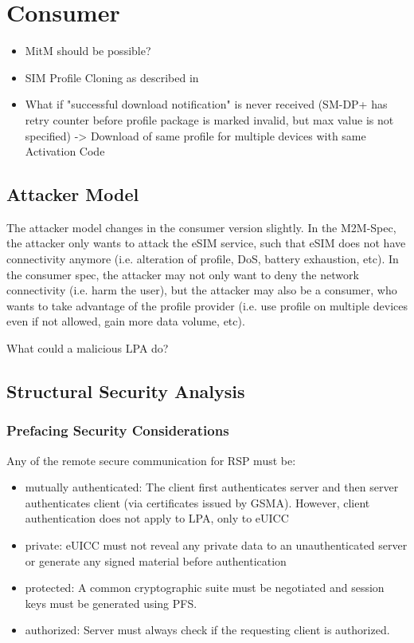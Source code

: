 \section{Consumer}
\begin{itemize}
    \item MitM should be possible? 
    \item SIM Profile Cloning as described in \parencite{Ahmed:TransparancyProfile}
    \item What if "successful download notification" is never received (SM-DP+ has retry counter before profile package is marked invalid, but max value is not specified) -> Download of same profile for multiple devices with same Activation Code
\end{itemize}

\subsection{Attacker Model}
The attacker model changes in the consumer version slightly. In the M2M-Spec, the attacker only wants to attack the eSIM service, such that eSIM does not have connectivity anymore (i.e. alteration of profile, DoS, battery exhaustion, etc). In the consumer spec, the attacker may not only want to deny the network connectivity (i.e. harm the user), but the attacker may also be a consumer, who wants to take advantage of the profile provider (i.e. use profile on multiple devices even if not allowed, gain more data volume, etc). 

What could a malicious LPA do?

\subsection{Structural Security Analysis}

\subsubsection{Prefacing Security Considerations}
Any of the remote secure communication for RSP must be:
\begin{itemize}
    \item mutually authenticated: The client first authenticates server and then server authenticates client (via certificates issued by GSMA). However, client authentication does not apply to LPA, only to eUICC
    \item private: eUICC must not reveal any private data to an unauthenticated server or generate any signed material before authentication
    \item protected: A common cryptographic suite must be negotiated and session keys must be generated using PFS.
    \item authorized: Server must always check if the requesting client is authorized.
\end{itemize}

